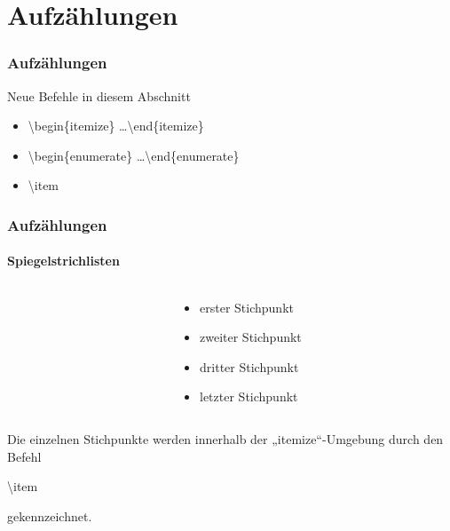 \section{Aufz\"ahlungen}
\begin{frame}
\frametitle{Aufzählungen}

\begin{block}{Neue Befehle in diesem Abschnitt}
\begin{itemize}
\item \color{unibablueI}\textbackslash begin\color{black}\{itemize\} \ldots \color{unibablueI}\textbackslash end\color{black}\{itemize\} 
\item \color{unibablueI}\textbackslash begin\color{black}\{enumerate\} \ldots \color{unibablueI}\textbackslash end\color{black}\{enumerate\} 
\item \color{nounibaredI}\textbackslash item\color{black}%
\end{itemize}
\end{block}
\end{frame}

\begin{frame}
\frametitle{Aufzählungen}
\framesubtitle{Spiegelstrichlisten}

\begin{columns}
\begin{column}{.5\textwidth}
\begin{ttfamily}%

\end{ttfamily}
\end{column}
\begin{column}{.5\textwidth}
\begin{itemize}
\item erster Stichpunkt
\item zweiter Stichpunkt
\item dritter Stichpunkt
\item letzter Stichpunkt
\end{itemize}
\end{column}
\end{columns}
\bigskip

Die einzelnen Stichpunkte werden innerhalb der „itemize“-Umgebung durch den Befehl \begin{ttfamily}\color{nounibaredI}\textbackslash item\color{black}\end{ttfamily} gekennzeichnet.
\end{frame}

